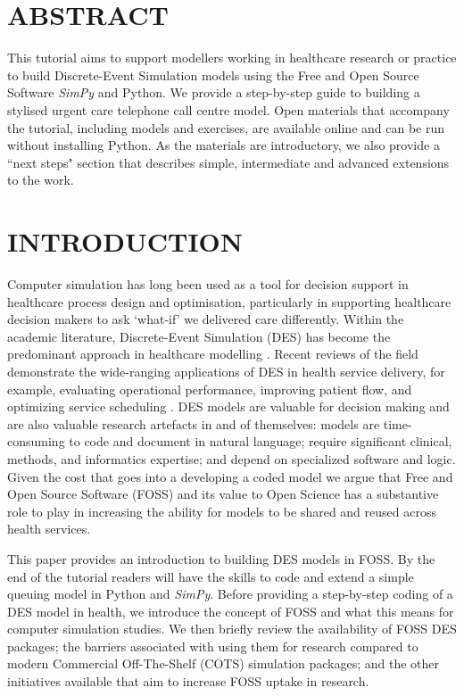 \documentclass{swpaperproc}
\theoremstyle{sw}
\begin{document}
\section*{ABSTRACT}
This tutorial aims to support modellers working in healthcare research or practice to build Discrete-Event Simulation models using the Free and Open Source Software \textit{SimPy} and Python. We provide a step-by-step guide to building a stylised urgent care telephone call centre model. Open materials that accompany the tutorial, including models and exercises, are available online and can be run without installing Python. As the materials are introductory, we also provide a ``next steps" section that describes simple, intermediate and advanced extensions to the work.


\section{INTRODUCTION}
\label{sec:intro}

Computer simulation has long been used as a tool for decision support in healthcare process design and optimisation, particularly in supporting healthcare decision makers to ask `what-if' we delivered care differently. Within the academic literature, Discrete-Event Simulation (DES) has become the predominant approach in healthcare modelling . Recent reviews of the field demonstrate the wide-ranging applications of DES in health service delivery, for example, evaluating operational performance, improving patient flow, and optimizing service scheduling . DES models are valuable for decision making and are also valuable research artefacts in and of themselves: models are time-consuming to code and document in natural language; require significant clinical, methods, and informatics expertise; and depend on specialized software and logic. Given the cost that goes into a developing a coded model we argue that Free and Open Source Software (FOSS) and its value to Open Science  has a substantive role to play in increasing the ability for models to be shared and reused across health services. 


This paper provides an introduction to building DES models in FOSS. By the end of the tutorial readers will have the skills to code and extend a simple queuing model in Python and \textit{SimPy}. Before providing a step-by-step coding of a DES model in health, we introduce the concept of FOSS and what this means for computer simulation studies. We then briefly review the availability of FOSS DES packages;  the barriers associated with using them for research compared to modern Commercial Off-The-Shelf (COTS) simulation packages; and the other initiatives available that aim to increase FOSS uptake in research.
\end{document}
